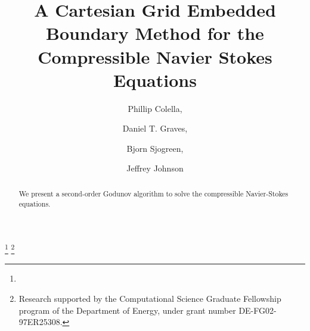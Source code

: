 \documentclass{elsart}
\begin{document}
\begin{frontmatter}


\title{A Cartesian Grid Embedded Boundary Method for the Compressible
  Navier Stokes Equations}


\author{Phillip Colella, }
\author{Daniel T. Graves,}
\author{Bjorn Sjogreen,  }
\author{Jeffrey Johnson  }
\thanks[lbl]{}
\thanks[ben]{Research supported by the Computational Science Graduate Fellowship program of the Department of Energy, under grant number DE-FG02-97ER25308.}
\address{Lawrence Berkeley National Laboratory, Berkeley, CA}
\address{Mathematics Department, University of Michigan, Ann Arbor, MI
}


\begin{abstract}
We present a second-order Godunov algorithm to solve the
compressible Navier-Stokes equations.
\end{abstract}

\begin{keyword}


\end{keyword}

\end{frontmatter}










\appendix










\end{document}
